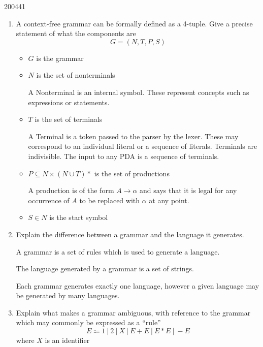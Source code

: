 \documentclass[10pt,\jkfside,a4paper]{article}
\begin{document}
\begin{examquestion}{2004}{4}{1}

\begin{enumerate}

\item A context-free grammar can be formally defined as a 4-tuple. Give a 
precise statement of what the components are
\[
G = (N, T, P, S)
\]

\begin{itemize}

\item $G$ is the grammar

\item $N$ is the set of nonterminals

A Nonterminal is an internal symbol. These represent concepts such as
expressions or statements.

\item $T$ is the set of terminals

A Terminal is a token passed to the parser by the lexer. These may
correspond to an individual literal or a sequence of literals. Terminals are
indivisible. The input to any PDA is a sequence of terminals.

\item $P \subseteq N \times (N \cup T)*$ is the set of productions

A production is of the form $A \to \alpha$ and says that it is legal for any
occurrence of $A$ to be replaced with $\alpha$ at any point.

\item $S \in N$ is the start symbol

\end{itemize}

\item Explain the difference between a grammar and the language it generates.

A grammar is a set of rules which is used to generate a language.

The language generated by a grammar is a set of strings.

Each grammar generates exactly one language, however a given language may be
generated by many languages.

\item Explain what makes a grammar ambiguous, with reference to the grammar 
which may commonly be expressed as a ``rule''
\[
E \Coloneqq 1 \ | \ 2 \ | \ X \ | \ E + E \ | \ E * E \ | \ - E
\]
where $X$ is an identifier


\end{enumerate}
\end{examquestion}
\end{document}
